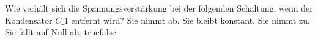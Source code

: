     {Wie verhält sich die Spannungsverstärkung bei der folgenden Schaltung, wenn der Kondensator $C\_1$ entfernt wird?}
    {Sie nimmt ab.}
    {Sie bleibt konstant.}
    {Sie nimmt zu.}
    {Sie fällt auf Null ab.}
    {true}{false}